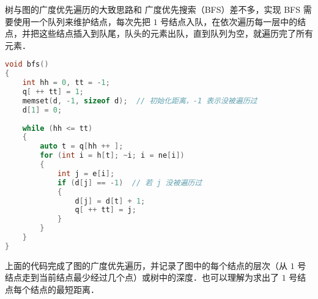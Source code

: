 
树与图的广度优先遍历的大致思路和 广度优先搜索（BFS）差不多，实现 BFS 需要使用一个队列来维护结点，每次先把 $1$ 号结点入队，在依次遍历每一层中的结点，并把这些结点插入到队尾，队头的元素出队，直到队列为空，就遍历完了所有元素．

\begin{lstlisting}[language=cpp]
void bfs()
{
    int hh = 0, tt = -1;
    q[ ++ tt] = 1;
    memset(d, -1, sizeof d);  // 初始化距离，-1 表示没被遍历过
    d[1] = 0;
    
    while (hh <= tt)
    {
        auto t = q[hh ++ ];
        for (int i = h[t]; ~i; i = ne[i])
        {
            int j = e[i];
            if (d[j] == -1)  // 若 j 没被遍历过
            {
                d[j] = d[t] + 1;
                q[ ++ tt] = j;
            }
        }
    }
}
\end{lstlisting}

上面的代码完成了图的广度优先遍历，并记录了图中的每个结点的层次（从 $1$ 号结点走到当前结点最少经过几个点）或树中的深度．也可以理解为求出了 $1$ 号结点每个结点的最短距离．
